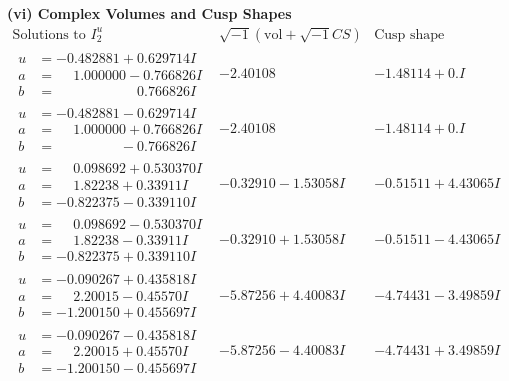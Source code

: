\documentclass[1p]{elsarticle_modified}
\theoremstyle{definition}
\newcommand{\I}{\sqrt{-1}}
\begin{document}
\newpage\flushleft \textbf{(vi) Complex Volumes and Cusp Shapes}
$$\begin{array}{c|c|c}  
\text{Solutions to }I^u_{2}& \I (\text{vol} + \sqrt{-1}CS) & \text{Cusp shape}\\
 \hline 
\begin{aligned}
u &= -0.482881 + 0.629714 I \\
a &= \phantom{-}1.000000 - 0.766826 I \\
b &= \phantom{-0.000000 -}0.766826 I\end{aligned}
 & -2.40108\phantom{ +0.000000I} & -1.48114 + 0. I\phantom{ +0.000000I} \\ \hline\begin{aligned}
u &= -0.482881 - 0.629714 I \\
a &= \phantom{-}1.000000 + 0.766826 I \\
b &= \phantom{-0.000000 } -0.766826 I\end{aligned}
 & -2.40108\phantom{ +0.000000I} & -1.48114 + 0. I\phantom{ +0.000000I} \\ \hline\begin{aligned}
u &= \phantom{-}0.098692 + 0.530370 I \\
a &= \phantom{-}1.82238 + 0.33911 I \\
b &= -0.822375 - 0.339110 I\end{aligned}
 & -0.32910 - 1.53058 I & -0.51511 + 4.43065 I \\ \hline\begin{aligned}
u &= \phantom{-}0.098692 - 0.530370 I \\
a &= \phantom{-}1.82238 - 0.33911 I \\
b &= -0.822375 + 0.339110 I\end{aligned}
 & -0.32910 + 1.53058 I & -0.51511 - 4.43065 I \\ \hline\begin{aligned}
u &= -0.090267 + 0.435818 I \\
a &= \phantom{-}2.20015 - 0.45570 I \\
b &= -1.200150 + 0.455697 I\end{aligned}
 & -5.87256 + 4.40083 I & -4.74431 - 3.49859 I \\ \hline\begin{aligned}
u &= -0.090267 - 0.435818 I \\
a &= \phantom{-}2.20015 + 0.45570 I \\
b &= -1.200150 - 0.455697 I\end{aligned}
 & -5.87256 - 4.40083 I & -4.74431 + 3.49859 I \\ \hline\begin{aligned}

\end{aligned}
\end{array}$$
\end{document}
